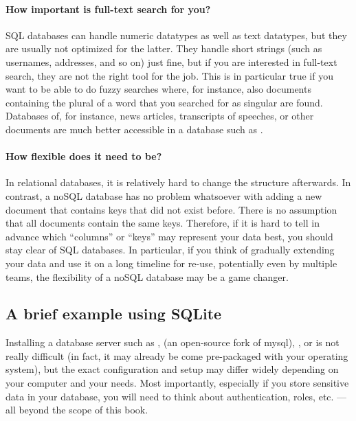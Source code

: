 \paragraph{How important is full-text search for you?} SQL databases can handle numeric datatypes as well as text datatypes, but they are usually not optimized for the latter. They handle short strings (such as usernames, addresses, and so on) just fine, but if you are interested in full-text search, they are not the right tool for the job. This is in particular true if you want to be able to do fuzzy searches where, for instance, also documents containing the plural of a word that you searched for as singular are found. Databases of, for instance, news articles, transcripts of speeches, or other documents are much better accessible in a database such as .


\paragraph{How flexible does it need to be?} In relational databases, it is relatively hard to change the structure afterwards. In contrast, a noSQL database has no problem whatsoever with adding a new document that contains keys that did not exist before. There is no assumption that all documents contain the same keys. Therefore, if it is hard to tell in advance which ``columns'' or ``keys'' may represent your data best, you should stay clear of SQL databases. In particular, if you think of gradually extending your data and use it on a long timeline for re-use, potentially even by multiple teams, the flexibility of a noSQL database may be a game changer.



\subsection{A brief example using SQLite}

Installing a database server such as ,  (an
open-source fork of mysql), , or  is
not really difficult (in fact, it may already be come pre-packaged
with your operating system), but the exact configuration and setup may
differ widely depending on your computer and your needs. Most
importantly, especially if you store sensitive data in your database,
you will need to think about authentication, roles, etc. --- all
beyond the scope of this book.

